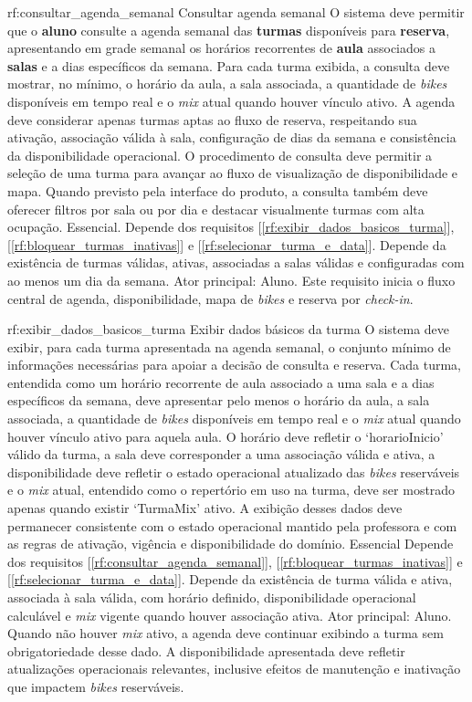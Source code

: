 \reqfuncfull
{rf:consultar_agenda_semanal}
{Consultar agenda semanal}
{O sistema deve permitir que o \textbf{aluno} consulte a agenda semanal das \textbf{turmas} disponíveis para \textbf{reserva}, apresentando em grade semanal os horários recorrentes de \textbf{aula} associados a \textbf{salas} e a dias específicos da semana. Para cada turma exibida, a consulta deve mostrar, no mínimo, o horário da aula, a sala associada, a quantidade de \textit{bikes} disponíveis em tempo real e o \textit{mix} atual quando houver vínculo ativo. A agenda deve considerar apenas turmas aptas ao fluxo de reserva, respeitando sua ativação, associação válida à sala, configuração de dias da semana e consistência da disponibilidade operacional. O procedimento de consulta deve permitir a seleção de uma turma para avançar ao fluxo de visualização de disponibilidade e mapa. Quando previsto pela interface do produto, a consulta também deve oferecer filtros por sala ou por dia e destacar visualmente turmas com alta ocupação.}
{Essencial.}
{Depende dos requisitos [\ref{rf:exibir_dados_basicos_turma}], [\ref{rf:bloquear_turmas_inativas}] e [\ref{rf:selecionar_turma_e_data}]. Depende da existência de turmas válidas, ativas, associadas a salas válidas e configuradas com ao menos um dia da semana.}
{Ator principal: Aluno. Este requisito inicia o fluxo central de agenda, disponibilidade, mapa de \textit{bikes} e reserva por \textit{check-in}.}

\reqfuncfull
{rf:exibir_dados_basicos_turma}
{Exibir dados básicos da turma}
{O sistema deve exibir, para cada turma apresentada na agenda semanal, o conjunto mínimo de informações necessárias para apoiar a decisão de consulta e reserva. Cada turma, entendida como um horário recorrente de aula associado a uma sala e a dias específicos da semana, deve apresentar pelo menos o horário da aula, a sala associada, a quantidade de \textit{bikes} disponíveis em tempo real e o \textit{mix} atual quando houver vínculo ativo para aquela aula. O horário deve refletir o `horarioInicio' válido da turma, a sala deve corresponder a uma associação válida e ativa, a disponibilidade deve refletir o estado operacional atualizado das \textit{bikes} reserváveis e o \textit{mix} atual, entendido como o repertório em uso na turma, deve ser mostrado apenas quando existir `TurmaMix' ativo. A exibição desses dados deve permanecer consistente com o estado operacional mantido pela professora e com as regras de ativação, vigência e disponibilidade do domínio.}
{Essencial}
{Depende dos requisitos [\ref{rf:consultar_agenda_semanal}], [\ref{rf:bloquear_turmas_inativas}] e [\ref{rf:selecionar_turma_e_data}]. Depende da existência de turma válida e ativa, associada à sala válida, com horário definido, disponibilidade operacional calculável e \textit{mix} vigente quando houver associação ativa.}
{Ator principal: Aluno. Quando não houver \textit{mix} ativo, a agenda deve continuar exibindo a turma sem obrigatoriedade desse dado. A disponibilidade apresentada deve refletir atualizações operacionais relevantes, inclusive efeitos de manutenção e inativação que impactem \textit{bikes} reserváveis.}

